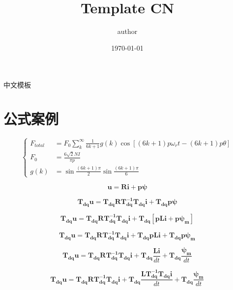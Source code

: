 \documentclass{MyTemplate}
\begin{document}
\title{Template CN}
\author{author}
\date{\today}
\maketitle
% 

中文模板

\section{公式案例}
\begin{equation}
	\left\{
		\begin{aligned}
			\label{eq:demo}
			F_{total} &= F_0 \sum_{k}^{\infty} \frac{1}{6k+1} g(k) \cos[(6k+1)p\omega_r t -(6k+1)p\theta]\\
			F_0 &= \frac{6 \sqrt{2} N I}{\pi p}\\
			g(k) &= \sin \frac{(6k+1)\pi}{2} \sin \frac{(6k+1)\pi}{6}
		\end{aligned}
	\right.
\end{equation}

\begin{equation}
	\bm{u} = \bm{R} \bm{i} + \bm{p} \bm{\psi}
\end{equation}


\begin{equation}
	\bm{T_{dq}} \bm{u} =\bm{T_{dq}} \bm{R} \bm{T_{dq}^{-1}}
\bm{T_{dq}}  \bm{i} + \bm{T_{dq}} \bm{p} \bm{\psi} 
\end{equation}

\begin{equation}
	\bm{T_{dq}} \bm{u} =\bm{T_{dq}} \bm{R} \bm{T_{dq}^{-1}}
	\bm{T_{dq}}  \bm{i} + \bm{T_{dq}} [\bm{p} \bm{L} \bm{i} + \bm{p} \bm{\psi_m}]
\end{equation}


\begin{equation}
	\bm{T_{dq}} \bm{u} =\bm{T_{dq}} \bm{R} \bm{T_{dq}^{-1}}
	\bm{T_{dq}}  \bm{i} + \bm{T_{dq}} \bm{p} \bm{L} \bm{i} + \bm{T_{dq}} 
	\bm{p} \bm{\psi_m}
\end{equation}


\begin{equation}
	\bm{T_{dq}} \bm{u} =\bm{T_{dq}} \bm{R} \bm{T_{dq}^{-1}}
	\bm{T_{dq}}  \bm{i} + \bm{T_{dq}} \frac{\bm{L} \bm{i}}{dt} + \bm{T_{dq}} 
	\frac{\bm{\psi_m}}{dt} 
\end{equation}


\begin{equation}
	\bm{T_{dq}} \bm{u} =\bm{T_{dq}} \bm{R} \bm{T_{dq}^{-1}}
	\bm{T_{dq}}  \bm{i} + \bm{T_{dq}} 
	\frac{\bm{L} \bm{T_{dq}^{-1}} \bm{T_{dq}}\bm{i}}{dt} + 
	\bm{T_{dq}} \frac{\bm{\psi_m}}{dt} 
\end{equation}
\end{document}
